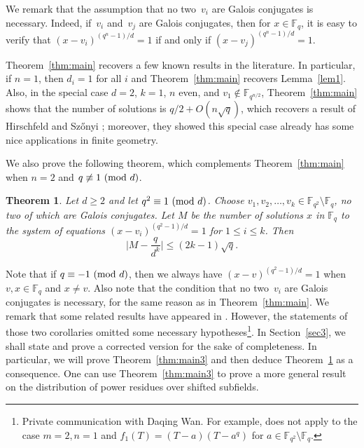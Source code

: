 \documentclass[12pt,reqno]{amsart}
\newtheorem{thm}{Theorem}[section]
\theoremstyle{definition}
\newcommand{\F}{\mathbb{F}}
\renewcommand{\pmod}[1]{{\ifmmode\text{\rm\ (mod~$#1$)}\else\discretionary{}{}{\hbox{ }}\rm(mod~$#1$)\fi}}
\begin{document}
\noindent
We remark that the assumption that no two~$v_i$ are Galois conjugates is necessary. Indeed, if~$v_i$ and~$v_j$ are Galois conjugates, then for $x \in \F_q$, it is easy to verify that $(x-v_i)^{(q^n-1)/d}=1$ if and only if $(x-v_j)^{(q^n-1)/d}=1$. 

Theorem~\ref{thm:main} recovers a few known results in the literature. In particular, if $n=1$, then $d_i=1$ for all $i$ and Theorem~\ref{thm:main} recovers Lemma~\ref{lem1}. Also, in the special case $d=2$, $k=1$, $n$ even, and $v_1 \notin \F_{q^{n/2}}$, Theorem~\ref{thm:main} shows that the number of solutions is $q/2+O(n\sqrt{q})$, which recovers a result of Hirschfeld and Sz{\H{o}}nyi \cite{HS90}; moreover, they showed this special case already has some nice applications in finite geometry.

We also prove the following theorem, which complements Theorem~\ref{thm:main} when $n=2$ and $q \not \equiv 1 \pmod d$. 

\begin{thm}\label{thm:main2}
Let $d \geq 2$ and let $q^2 \equiv 1 \pmod d$. Choose $v_1, v_2, \ldots, v_k \in \F_{q^2} \setminus \F_q$, no two of which are Galois conjugates. Let $M$ be the number of solutions $x$ in $\F_q$ to the system of equations $(x-v_i)^{(q^2-1)/d}=1$ for $1 \leq i \leq k$. Then
$$
\bigg |M- \frac{q}{d^k}\bigg|\leq (2k-1)\sqrt{q}.
$$    
\end{thm}

Note that if $q \equiv -1 \pmod d$, then we always have $(x-v)^{(q^2-1)/d}=1$ when $v,x \in \F_q$ and $x \neq v$. Also note that the condition that no two~$v_i$ are Galois conjugates is necessary, for the same reason as in Theorem~\ref{thm:main}. We remark that some related results have appeared in \cite[Corollaries~2.4 and~2.5]{W97}. However, the statements of those two corollaries omitted some necessary hypotheses\footnote{Private communication with Daqing Wan. For example, \cite[Corollary 2.4]{W97} does not apply to the case $m=2, n=1$ and $f_1(T)=(T-a)(T-a^q)$ for $a \in \F_{q^2} \setminus \F_q$.}. In Section~\ref{sec3}, we shall state and prove a corrected version for the sake of completeness. In particular, we will prove Theorem~\ref{thm:main3} and then deduce Theorem~\ref{thm:main2} as a consequence. One can use Theorem~\ref{thm:main3} to prove a more general result on the distribution of power residues over shifted subfields. 
\end{document}
